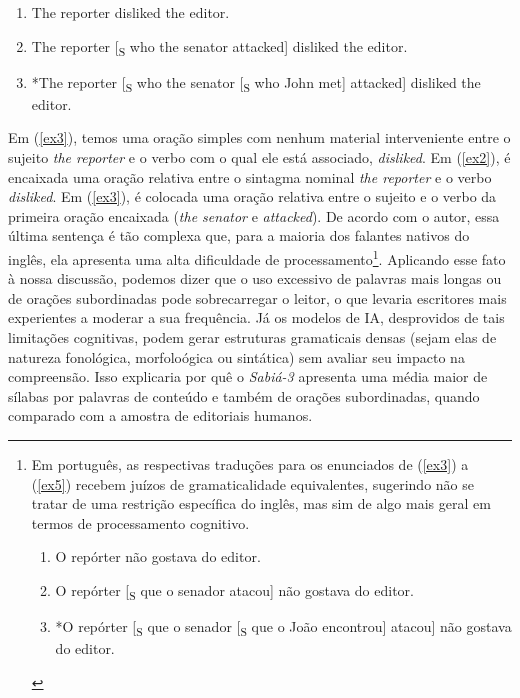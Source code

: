 \documentclass[portuguese]{textolivre}
\begin{document}
\begin{enumerate}[resume=exlist]
\item The reporter disliked the editor.\label{ex3}
\item The reporter [\textsubscript{S} who the senator attacked] disliked the editor.\label{ex4}
\item *The reporter [\textsubscript{S} who the senator [\textsubscript{S} who John met] attacked] disliked the editor.\label{ex5}
\end{enumerate}

Em (\ref{ex3}), temos uma oração simples com nenhum material interveniente entre o sujeito \emph{the reporter} e o verbo com o qual ele está associado, \emph{disliked}.
Em (\ref{ex2}), é encaixada uma oração relativa entre o sintagma nominal \emph{the reporter} e o verbo \emph{disliked}.
Em (\ref{ex3}), é colocada uma oração relativa entre o sujeito e o verbo da primeira oração encaixada (\emph{the senator} e \emph{attacked}).
De acordo com o autor, essa última sentença é tão complexa que, para a maioria dos falantes nativos do inglês, ela apresenta uma alta dificuldade de processamento\footnote{Em português, as respectivas traduções para os enunciados de (\ref{ex3}) a (\ref{ex5}) recebem juízos de gramaticalidade equivalentes, sugerindo não se tratar de uma restrição específica do inglês, mas sim de algo mais geral em termos de processamento cognitivo.
  \begin{enumerate}[label=\roman*.]
  \item O repórter não gostava do editor.
  \item O repórter [\textsubscript{S} que o senador atacou] não gostava do editor.
  \item *O repórter [\textsubscript{S} que o senador [\textsubscript{S} que o João encontrou] atacou] não gostava do editor.
  \end{enumerate}}.
Aplicando esse fato à nossa discussão, podemos dizer que o uso excessivo de palavras mais longas ou de orações subordinadas pode sobrecarregar o leitor, o que levaria escritores mais experientes a moderar a sua frequência.
Já os modelos de IA, desprovidos de tais limitações cognitivas, podem gerar estruturas gramaticais densas (sejam elas de natureza fonológica, morfoloógica ou sintática) sem avaliar seu impacto na compreensão.
Isso explicaria por quê o \emph{Sabiá-3} apresenta uma média maior de sílabas por palavras de conteúdo e também de orações subordinadas, quando comparado com a amostra de editoriais humanos.
\end{document}
